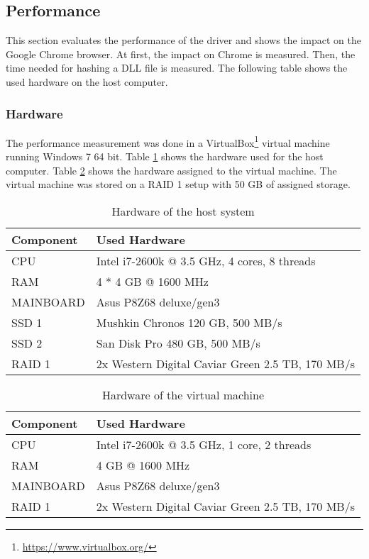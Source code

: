 \subsection{Performance}
This section evaluates the performance of the driver and shows the impact on the Google Chrome browser. At first, the impact on Chrome is measured. Then, the time needed for hashing a \gls{DLL} file is measured. The following table shows the used hardware on the host computer.

\subsubsection{Hardware}
The performance measurement was done in a VirtualBox\footnote{\url{https://www.virtualbox.org/}} virtual machine running Windows 7 64 bit. Table \ref{fig:hardware_host} shows the hardware used for the host computer. Table \ref{fig:hardware_vm} shows the hardware assigned to the virtual machine. The virtual machine was stored on a RAID 1 setup with 50 GB of assigned storage. 
\def\arraystretch{1.1}%

\begin{table}[]
\centering
\begin{tabularx}{\textwidth}{|l|X|}
\hline
Component & Used Hardware \\ \hline
CPU & Intel i7-2600k @ 3.5 GHz, 4 cores, 8 threads \\ \hline
RAM & 4 * 4 GB @ 1600 MHz \\ \hline
MAINBOARD & Asus P8Z68 deluxe/gen3 \\ \hline
SSD 1 & Mushkin Chronos 120 GB, 500 MB/s \\ \hline
SSD 2 & San Disk Pro 480 GB, 500 MB/s \\ \hline
RAID 1 & 2x Western Digital Caviar Green 2.5 TB, 170 MB/s \\ \hline
\end{tabularx}
\caption{Hardware of the host system}
\label{fig:hardware_host}
\end{table}

\begin{table}[]
\centering
\begin{tabularx}{\textwidth}{|l|X|}
\hline
Component & Used Hardware \\ \hline
CPU & Intel i7-2600k @ 3.5 GHz, 1 core, 2 threads \\ \hline
RAM & 4 GB @ 1600 MHz \\ \hline
MAINBOARD & Asus P8Z68 deluxe/gen3 \\ \hline
RAID 1 & 2x Western Digital Caviar Green 2.5 TB, 170 MB/s \\ \hline
\end{tabularx}
\caption{Hardware of the virtual machine}
\label{fig:hardware_vm}
\end{table}

